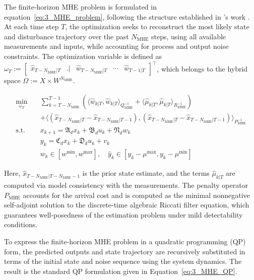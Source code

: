 The finite-horizon MHE problem is formulated in equation~\eqref{eq:3_MHE_problem}, following the structure established in 's work \autocite{xie2022constrained}. At each time step $T$, the optimization seeks to reconstruct the most likely state and disturbance trajectory over the past $N_{\mathrm{MHE}}$ steps, using all available measurements and inputs, while accounting for process and output noise constraints. The optimization variable is defined as $ \omega_T := \begin{bmatrix}\hat{x}_{T-N_{\mathrm{MHE}}|T} & \bigl. {} \bigr| & \hat{w}_{T-N_{\mathrm{MHE}}|T} & \cdots & \hat{w}_{T-1|T}\end{bmatrix}^\top$, which belongs to the hybrid space $\Omega := X \times W^{N_{\mathrm{MHE}}}$.

\begin{equation} \label{eq:3_MHE_problem}
\begin{aligned}
\min_{\omega_T} \quad & 
\sum_{k=T-N_{\mathrm{MHE}}}^{T-1} \left( \langle \hat{w}_{k|T}, \hat{w}_{k|T} \rangle_{Q_{\mathrm{MHE}}^{-1}} + \langle \hat{{\mu}}_{k|T}, \hat{{\mu}}_{k|T} \rangle_{R_{\mathrm{MHE}}^{-1}} \right) \\
&+ \langle (\hat{x}_{T{-}N_{\mathrm{MHE}}|T} - \hat{x}_{T{-}N_{\mathrm{MHE}}|T{-}1}), (\hat{x}_{T{-}N_{\mathrm{MHE}}|T} - \hat{x}_{T{-}N_{\mathrm{MHE}}|T{-}1}) \rangle_{P_{\mathrm{MHE}}^{-1}} \\
\text{s.t.} \quad
& x_{k+1} = \mathfrak{A}_d x_k + \mathfrak{B}_d u_k + \mathfrak{N}_d w_k \\
& y_k = \mathfrak{C}_d x_k + \mathfrak{D}_d u_k + v_k \\
& w_k \in [w^{\min}, w^{\max}], \quad \hat{y}_k \in [y_k - {\mu}^{\max}, y_k - {\mu}^{\min}]
\end{aligned}
\end{equation}

Here, $\hat{x}_{T-N_{\mathrm{MHE}}|T-N_{\mathrm{MHE}}-1}$ is the prior state estimate, and the terms $\hat{{\mu}}_{k|T}$ are computed via model consistency with the measurements. The penalty operator $P_{\mathrm{MHE}}$ accounts for the arrival cost and is computed as the minimal nonnegative self-adjoint solution to the discrete-time algebraic Riccati filter equation\autocite{xie2022constrained}, which guarantees well-posedness of the estimation problem under mild detectability conditions.

To express the finite-horizon MHE problem in a quadratic programming (QP) form, the predicted outputs and state trajectory are recursively substituted in terms of the initial state and noise sequence using the system dynamics. The result is the standard QP formulation given in Equation~\ref{eq:3_MHE_QP}.

